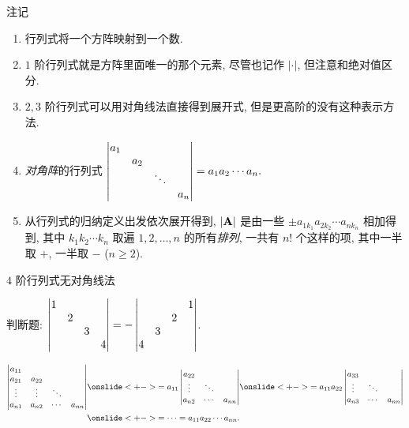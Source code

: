 \begin{frame}{注记}
	\onslide<+->
	\begin{enumerate}
		\item 行列式将一个方阵映射到一个数.
		\item $1$ 阶行列式就是方阵里面唯一的那个元素, 尽管也记作 $|\cdot|$, 但注意和绝对值区分.
		\item $2,3$ 阶行列式可以用对角线法直接得到展开式, 但是更高阶的没有这种表示方法.
		\item \emph{对角阵}的行列式
		$\left|\begin{matrix}
			a_1&&&\\
			&a_2&&\\
			&&\ddots&\\
			&&&a_n
		\end{matrix}\right|=a_1a_2\cdots a_n.$
		\item 从行列式的归纳定义出发依次展开得到, $|{\mathbf{A}}|$ 是由一些 $\pm a_{1 k_1}a_{2 k_2}\cdots a_{n k_n}$ 相加得到, 其中 $k_1 k_2 \cdots k_n$ 取遍 $1,2,\dots,n$ 的所有\emph{排列}, 一共有 $n!$ 个这样的项, 其中一半取 $+$, 一半取 $-$ ($n\ge2$).
	\end{enumerate}
\end{frame}


\begin{frame}{$4$ 阶行列式无对角线法}
	\onslide<+->
	\begin{exercise}
		判断题: $\left|\begin{matrix}1&&&\\&2&&\\&&3&\\&&&4\end{matrix}\right|=-\left|\begin{matrix}&&&1\\&&2&\\&3&&\\4&&&\end{matrix}\right|$. \visible<+->{\Huge\color{red}{$\times$}}
	\end{exercise}
	\onslide<+->
	\begin{example}
		\begin{align*}
			\detm{a_{11}&      &      &\\
			a_{21}&a_{22}&      &\\
			\vdots&\vdots&\ddots&\\
			a_{n1}&a_{n2}&\cdots&a_{nn}}
		&\onslide<+->{=a_{11}\detm{
			a_{22}&      &\\
			\vdots&\ddots&\\
			a_{n2}&\cdots&a_{nn}
		}}
		\onslide<+->{=a_{11}a_{22}\detm{
			a_{33}&      &\\
			\vdots&\ddots&\\
			a_{n3}&\cdots&a_{nn}
		}}\\
		&\onslide<+->{=\cdots=a_{11}a_{22}\cdots a_{nn}.}
		\end{align*}
	\end{example}
\end{frame}


